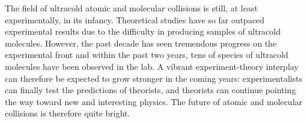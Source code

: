 \documentclass[%
 reprint,
 amsmath,amssymb,
 aps,
 nofootinbib
]{revtex4-1}
\begin{document}
The field of ultracold atomic and molecular collisions is still, at least experimentally, in its infancy. Theoretical studies have so far outpaced experimental results due to the difficulty in producing samples of ultracold molecules. However, the past decade has seen tremendous progress on the experimental front and within the past two years, tens of species of ultracold molecules have been observed in the lab. A vibrant experiment-theory interplay can therefore be expected to grow stronger in the coming years: experimentalists can finally test the predictions of theorists, and theorists can continue pointing the way toward new and interesting physics. The future of atomic and molecular collisions is therefore quite bright.

\end{document}
